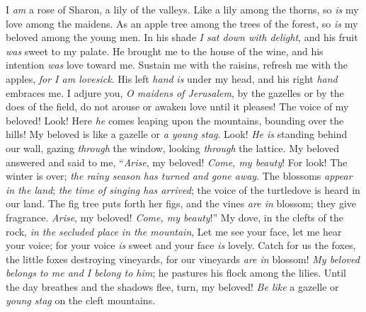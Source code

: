 \begin{biblechapter} %
 I \textit{am} a rose of Sharon, 
a lily of the valleys.
\verse Like a lily among the thorns, 
so \textit{is} my love among the maidens.
\verse As an apple tree among the trees of the forest, 
so \textit{is} my beloved among the young men. 
In his shade \textit{I sat down with delight}, 
and his fruit \textit{was} sweet to my palate.
 He brought me to the house of the wine, 
and his intention \textit{was} love toward me.
\verse Sustain me with the raisins, 
refresh me with the apples, 
\textit{for I \textit{am} lovesick}.
 His left \textit{hand} \textit{is} under my head, 
and his right \textit{hand} embraces me.
\verse I adjure you, \textit{O maidens of Jerusalem}, 
by the gazelles or by the does of the field, 
do not arouse or awaken love until it pleases!
 The voice of my beloved! 
Look! Here \textit{he} comes leaping upon the mountains, 
bounding over the hills!
\verse My beloved is like a gazelle or \textit{a young stag}. 
Look! \textit{He is} standing behind our wall, 
gazing \textit{through} the window, 
looking \textit{through} the lattice.
\verse My beloved answered and said to me, 
“\textit{Arise}, my beloved! \textit{Come, my beauty}!
\verse For look! The winter is over; 
\textit{the rainy season} \textit{has turned and gone away}.
\verse The blossoms \textit{appear} \textit{in the land}; 
\textit{the time of singing has arrived}; 
the voice of the turtledove is heard in our land.
\verse The fig tree puts forth her figs, 
and the vines \textit{are in} blossom; they give fragrance. 
\textit{Arise}, my beloved! \textit{Come, my beauty}!”
\verse My dove, in the clefts of the rock, 
\textit{in the secluded place} \textit{in the mountain}, 
Let me see your face, 
let me hear your voice; 
for your voice \textit{is} sweet and your face \textit{is} lovely.
\verse Catch for us the foxes, 
the little foxes destroying vineyards, 
for our vineyards \textit{are in} blossom!
 \textit{My beloved belongs to me and I belong to him}; 
he pastures his flock among the lilies.
\verse Until the day breathes and the shadows flee, 
turn, my beloved! 
\textit{Be like} a gazelle or \textit{young stag} on the cleft mountains.
\end{biblechapter}

